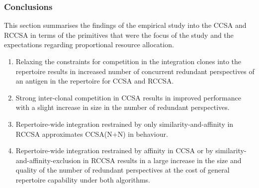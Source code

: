 %
%
\subsubsection{Conclusions}
This section summarises the findings of the empirical study into the CCSA and RCCSA in terms of the primitives that were the focus of the study and the expectations regarding proportional resource allocation.

\begin{enumerate}
		\item Relaxing the constraints for competition in the integration clones into the repertoire results in increased number of concurrent redundant perspectives of an antigen in the repertoire for CCSA and RCCSA.
		\item Strong inter-clonal competition in CCSA results in improved performance with a slight increase in size in the number of redundant perspectives.
		\item Repertoire-wide integration restrained by only similarity-and-affinity in RCCSA approximates CCSA(N+N) in behaviour.
		\item Repertoire-wide integration restrained by affinity in CCSA or by similarity-and-affinity-exclusion in RCCSA results in a large increase in the size and quality of the number of redundant perspectives at the cost of general repertoire capability under both algorithms. 		
\end{enumerate}

%
%
